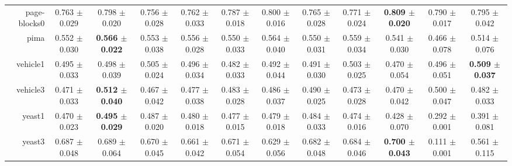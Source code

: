 \begin{table}[!ht]
{\begin{tabular}{r c c c c c c c c c c c}
page-blocks0 & 0.763 $\pm$ 0.029 & 0.798 $\pm$ 0.020 & 0.756 $\pm$ 0.028 & 0.762 $\pm$ 0.033 & 0.787 $\pm$ 0.018 & 0.800 $\pm$ 0.016 & 0.765 $\pm$ 0.028 & 0.771 $\pm$ 0.024 & \textbf{0.809 $\pm$ 0.020} & 0.790 $\pm$ 0.017 & 0.795 $\pm$ 0.042 \\
pima & 0.552 $\pm$ 0.030 & \textbf{0.566 $\pm$ 0.022} & 0.553 $\pm$ 0.038 & 0.556 $\pm$ 0.028 & 0.550 $\pm$ 0.033 & 0.564 $\pm$ 0.040 & 0.550 $\pm$ 0.031 & 0.559 $\pm$ 0.034 & 0.541 $\pm$ 0.030 & 0.466 $\pm$ 0.078 & 0.514 $\pm$ 0.076 \\
vehicle1 & 0.495 $\pm$ 0.033 & 0.498 $\pm$ 0.039 & 0.505 $\pm$ 0.024 & 0.496 $\pm$ 0.034 & 0.482 $\pm$ 0.033 & 0.492 $\pm$ 0.044 & 0.491 $\pm$ 0.030 & 0.503 $\pm$ 0.025 & 0.470 $\pm$ 0.054 & 0.496 $\pm$ 0.051 & \textbf{0.509 $\pm$ 0.037} \\
vehicle3 & 0.471 $\pm$ 0.033 & \textbf{0.512 $\pm$ 0.040} & 0.467 $\pm$ 0.042 & 0.477 $\pm$ 0.038 & 0.483 $\pm$ 0.028 & 0.486 $\pm$ 0.037 & 0.490 $\pm$ 0.025 & 0.473 $\pm$ 0.028 & 0.470 $\pm$ 0.042 & 0.500 $\pm$ 0.047 & 0.482 $\pm$ 0.033 \\
yeast1 & 0.470 $\pm$ 0.023 & \textbf{0.495 $\pm$ 0.029} & 0.487 $\pm$ 0.020 & 0.480 $\pm$ 0.018 & 0.477 $\pm$ 0.015 & 0.479 $\pm$ 0.018 & 0.484 $\pm$ 0.033 & 0.474 $\pm$ 0.016 & 0.428 $\pm$ 0.070 & 0.292 $\pm$ 0.001 & 0.391 $\pm$ 0.081 \\
yeast3 & 0.687 $\pm$ 0.048 & 0.689 $\pm$ 0.064 & 0.670 $\pm$ 0.045 & 0.661 $\pm$ 0.042 & 0.671 $\pm$ 0.054 & 0.629 $\pm$ 0.056 & 0.682 $\pm$ 0.048 & 0.684 $\pm$ 0.046 & \textbf{0.700 $\pm$ 0.043} & 0.111 $\pm$ 0.001 & 0.561 $\pm$ 0.115 \\
\end{tabular}}
\end{table}
